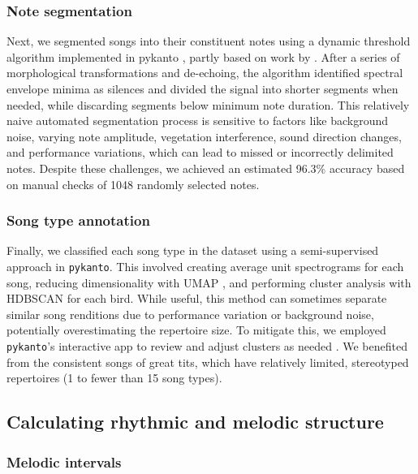 \subsubsection{Note segmentation}

Next, we segmented songs into their constituent notes using a dynamic threshold algorithm implemented in pykanto \parencite{merinorecalde2023}, partly based on work by \textcite{sainburg2019}. After a series of morphological transformations and de-echoing, the algorithm identified spectral envelope minima as silences and divided the signal into shorter segments when needed, while discarding segments below minimum note duration.
This relatively naive automated segmentation process is sensitive to factors like background noise, varying note amplitude, vegetation interference, sound direction changes, and performance variations, which can lead to missed or incorrectly delimited notes. Despite these challenges, we achieved an estimated 96.3\% accuracy based on manual checks of 1048 randomly selected notes.

\subsubsection{Song type annotation}

Finally, we classified each song type in the dataset using a semi-supervised approach in \texttt{pykanto}. This involved creating average unit spectrograms for each song, reducing dimensionality with UMAP \parencite{mcinnes2018}, and performing cluster analysis with HDBSCAN \parencite{mcinnes2017} for each bird. While useful, this method can sometimes separate similar song renditions due to performance variation or background noise, potentially overestimating the repertoire size. To mitigate this, we employed \texttt{pykanto}'s interactive app to review and adjust clusters as needed \cite{merinorecalde2023a}. We benefited from the consistent songs of great tits, which have relatively limited, stereotyped repertoires (1 to fewer than 15 song types).

\subsection{Calculating rhythmic and melodic structure}


\subsubsection{Melodic intervals}


